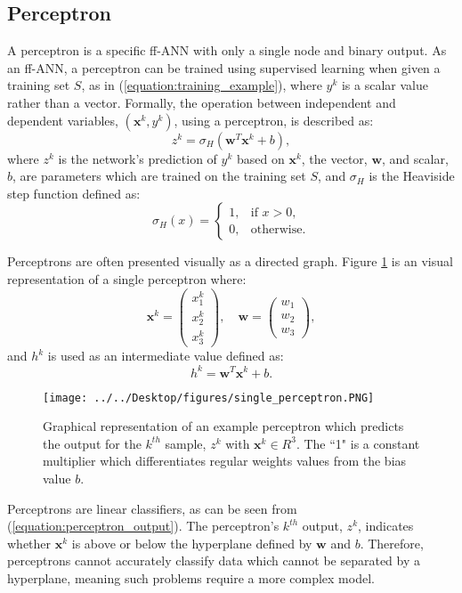 \documentclass[letterpaper,12pt,titlepage,oneside,final]{book}
\begin{document}
	\subsection{Perceptron}
	
	A perceptron is a specific ff-ANN with only a single node and binary output. As an ff-ANN, a perceptron can be trained using supervised learning when given a training set $S$, as in (\ref{equation:training_example}), where $y^{k}$ is a scalar value rather than a vector. Formally, the operation between independent and dependent variables, $(\mathbf{x}^{k},y^{k})$, using a perceptron, is described as:
	\begin{equation}
	z^{k} = \sigma_{H}(\mathbf{w}^{T}\mathbf{x}^{k} + b), 
	\label{equation:perceptron_output}
	\end{equation}
	where $z^{k}$ is the network's prediction of $y^{k}$ based on $\mathbf{x}^{k}$, the vector, $\mathbf{w}$, and scalar, $b$, are parameters which are trained on the training set $S$, and $\sigma_{H}$ is the Heaviside step function defined as:
	\begin{equation}
	\sigma_{H}(x)= 
	\begin{cases}
	1 ,& \text{if } x > 0,\\
	0,              & \text{otherwise}.
	\end{cases}
	\label{equation:heaviside_step}
	\end{equation}
	
	Perceptrons are often presented visually as a directed graph. Figure \ref{perceptron} is an visual representation of a single perceptron where:
	\begin{equation}
	\mathbf{x}^{k} = 
	\begin{pmatrix}
	x_{1}^{k}\\ 
	x_{2}^{k}\\
	x_{3}^{k}
	\end{pmatrix},
	\quad \mathbf{w} = 
	\begin{pmatrix}
	w_{1}\\ 
	w_{2}\\
	w_{3}
	\end{pmatrix},
	\end{equation}
 	and $h^{k}$ is used as an intermediate value defined as:
 	\begin{equation}
 	h^{k} = \mathbf{w}^{T}\mathbf{x}^{k} + b.
 	\end{equation}
	\begin{figure}[h]
		\centering
		\texttt{[image: ../../Desktop/figures/single\_perceptron.PNG]}
		\caption{Graphical representation of an example perceptron which predicts the output for the $k^{th}$ sample, $z^{k}$ with $\mathbf{x}^{k} 
			\in R^{3}$. The ``1" is a constant multiplier which differentiates regular weights values from the bias value $b$.}
		\label{perceptron}
	\end{figure}
	Perceptrons are linear classifiers, as can be seen from (\ref{equation:perceptron_output}). The perceptron's $k^{th}$ output, $z^{k}$, indicates whether $\mathbf{x}^{k}$ is above or below the hyperplane defined by $\mathbf{w}$ and $b$. Therefore, perceptrons cannot accurately classify data which cannot be separated by a hyperplane, meaning such problems require a more complex model.
	
\end{document}

